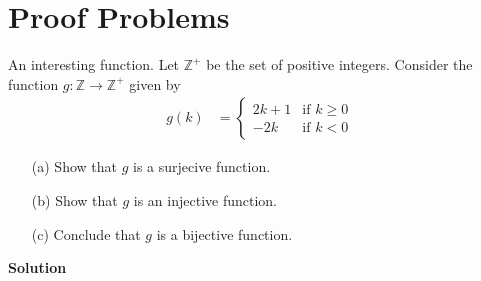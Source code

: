 \documentclass[11pt]{scrartcl}
\theoremstyle{dotlessP}
\theoremstyle{dotlessN}
\begin{document}
\section{Proof Problems}
\begin{ques}
An interesting function. Let $\mathbb{Z}^+$ be the set of positive integers. Consider the function $g: \mathbb{Z} \to \mathbb{Z}^+$ given by
    \begin{align*}
        g(k) &= \begin{cases}
            2k+1 & \text{if $k \geq 0$} \\
            -2k & \text{if $k<0$}
        \end{cases}
    \end{align*}
    \begin{itemize}
        \item[(a)] Show that $g$ is a surjecive function.
        \item[(b)] Show that $g$ is an injective function.
        \item[(c)] Conclude that $g$ is a bijective function.
    \end{itemize}
\end{ques}
\textbf{Solution}
\end{document}
